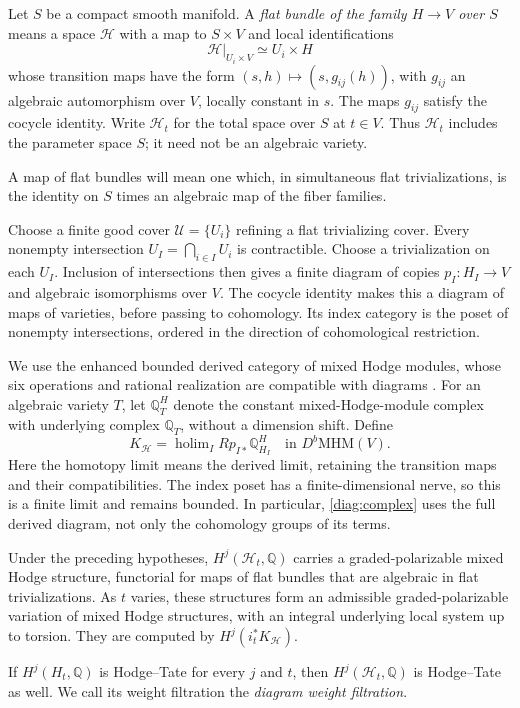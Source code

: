 Let $S$ be a compact smooth manifold.  A \emph{flat bundle of the family
$H\to V$ over $S$} means a space $\mathscr H$ with a map to $S\times V$
and local identifications
\[
 \mathscr H|_{U_i\times V}\simeq U_i\times H
\]
whose transition maps have the form
$(s,h)\mapsto(s,g_{ij}(h))$, with $g_{ij}$ an algebraic automorphism
over $V$, locally constant in $s$.  The maps $g_{ij}$ satisfy the cocycle
identity.  Write $\mathscr H_t$ for the total space over $S$ at $t\in V$.
Thus $\mathscr H_t$ includes the parameter space $S$; it need not be an
algebraic variety.

A map of flat bundles will mean one which, in simultaneous flat
trivializations, is the identity on $S$ times an algebraic map of the
fiber families.

Choose a finite good cover $\mathcal U=\{U_i\}$ refining a flat
trivializing cover.  Every nonempty intersection $U_I=\bigcap_{i\in I}U_i$
is contractible.  Choose a trivialization on each $U_I$.  Inclusion of
intersections then gives a finite diagram of copies
$p_I:H_I\to V$ and algebraic isomorphisms over $V$.
The cocycle identity makes this a diagram of maps of varieties, before
passing to cohomology.  Its index category is the poset of nonempty
intersections, ordered in the direction of cohomological restriction.

We use the enhanced bounded derived category of mixed Hodge modules,
whose six operations and rational realization are compatible with
diagrams \cite[Section~2.1, Theorem~2.1.1, Remark~2.1.2, and
Proposition~4.2.6]{TubachStacks2025}.
For an algebraic variety $T$, let $\mathbb Q_T^H$ denote the constant
mixed-Hodge-module complex with underlying complex $\mathbb Q_T$,
without a dimension shift.  Define
\begin{equation}
 \label{diag:complex}
 K_{\mathscr H}
   =\mathop{\mathrm{holim}}_I Rp_{I*}\mathbb Q_{H_I}^H
   \quad\text{in }D^b\mathrm{MHM}(V).
\end{equation}
Here the homotopy limit means the derived limit, retaining the
transition maps and their compatibilities.  The index poset has a
finite-dimensional nerve, so this is a finite limit and remains
bounded.  In particular, \eqref{diag:complex} uses the full derived
diagram, not only the cohomology groups of its terms.

\begin{proposition}
 \label{diag:variation}
 Under the preceding hypotheses, $H^j(\mathscr H_t,\mathbb Q)$ carries
 a graded-polarizable mixed Hodge structure, functorial for maps of flat
 bundles that are algebraic in flat trivializations.  As $t$ varies,
 these structures form an admissible graded-polarizable variation of
 mixed Hodge structures, with an integral underlying local system up
 to torsion.  They are computed by $H^j(i_t^*K_{\mathscr H})$.

 If $H^j(H_t,\mathbb Q)$ is Hodge--Tate for every $j$ and $t$, then
 $H^j(\mathscr H_t,\mathbb Q)$ is Hodge--Tate as well.  We call its
 weight filtration the \emph{diagram weight filtration}.
\end{proposition}

